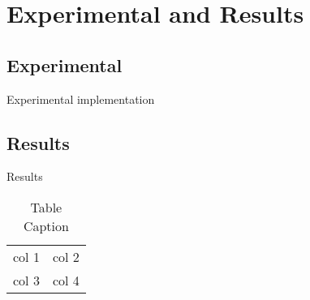 \chapter{Experimental and Results}
\section{Experimental}
Experimental implementation

\section{Results}

Results
\begin{table}[]
    \centering
    \begin{tabular}{c|c}
         col 1& col 2  \\
         col 3 &  col 4
    \end{tabular}
    \caption{Table Caption}
    \label{tab:my_label}
\end{table}